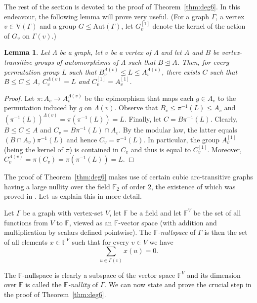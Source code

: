 \documentclass{amsart}
\newtheorem{lemma}[theorem]{Lemma}
\theoremstyle{definition}
\begin{document}
The rest of the section is devoted to the proof of Theorem~\ref{thm:deg6}. In this endeavour, 
the following lemma will prove very useful. (For a graph $\Gamma$, a vertex $v\in {\mathrm V}(\Gamma)$ and a group $G\le {\mathrm{Aut}}(\Gamma)$,
let $G_v^{[1]}$ denote the kernel of the action of $G_v$ on $\Gamma(v)$.)

\begin{lemma}
\label{lem:s}
Let $\Lambda$ be a graph, let $v$ be a vertex of $\Lambda$ and let $A$ and $B$ be vertex-transitive groups of automorphisms of $\Lambda$ such that $B\trianglelefteq A$. Then, for every permutation group $L$ such that $B_v^{\Lambda(v)}\leq L\leq A_v^{\Lambda(v)}$, there exists $C$ such that $B\leq C\leq A$,
$C_v^{\Lambda(v)}=L$ and $C_v^{[1]} = A_v^{[1]}$.
\end{lemma}

\begin{proof}
Let $\pi\colon A_v \to A_v^{\Lambda(v)}$ be the epimorphism that maps each $g\in A_v$ to the permutation induced by $g$ on $\Lambda(v)$. Observe that $B_v\leq \pi^{-1}(L)\leq A_v$ and $(\pi^{-1}(L))^{\Lambda(v)}=\pi(\pi^{-1}(L))=L$. Finally, let $C=B\pi^{-1}(L)$. Clearly, $B\leq C\leq A$ and  $C_v=B\pi^{-1}(L)\cap A_v$. By the modular law, the latter equals  $(B\cap A_v)\pi^{-1}(L)$ and hence $C_v=\pi^{-1}(L)$. In particular, the group $A_v^{[1]}$ (being the kernel of $\pi$) is contained in 
$C_v$ and thus is equal to $C_v^{[1]}$. Moreover, $C_v^{\Lambda(v)}= \pi(C_v) = \pi(\pi^{-1}(L)) = L$.
\end{proof}

The proof of Theorem~\ref{thm:deg6} makes use of certain cubic arc-transitive graphs having a large nullity over the field ${{\mathbb F}}_2$
of order $2$, the existence of which was proved in \cite{null}. Let us explain this in more detail.

Let $\Gamma$ be a graph with vertex-set $V$, let ${{\mathbb F}}$ be a field and let ${{\mathbb F}}^V$ be the set of all functions from $V$ to ${{\mathbb F}}$,
viewed as an ${{\mathbb F}}$-vector space (with addition and multiplication by scalars defined pointwise). The {\em ${{\mathbb F}}$-nullspace} of
$\Gamma$ is then the set of all elements $x\in {{\mathbb F}}^V$ such that for every $v\in V$ we have
$$ \sum_{u\in \Gamma(v)}x(u) = 0.
$$

The ${{\mathbb F}}$-nullspace is clearly a subspace of the vector space ${{\mathbb F}}^V$ and its dimension over ${{\mathbb F}}$ is called the {\em ${{\mathbb F}}$-nullity} of $\Gamma$. We can now state and prove the crucial step in the proof of Theorem~\ref{thm:deg6}.
\end{document}
